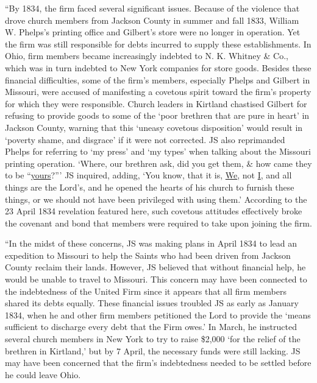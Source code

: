 			``By 1834, the firm faced several significant issues. Because of the violence that drove church members from Jackson County in summer and fall 1833, William W. Phelps's printing office and Gilbert's store were no longer in operation. Yet the firm was still responsible for debts incurred to supply these establishments. In Ohio, firm members became increasingly indebted to N. K. Whitney \& Co., which was in turn indebted to New York companies for store goods. Besides these financial difficulties, some of the firm's members, especially Phelps and Gilbert in Missouri, were accused of manifesting a covetous spirit toward the firm's property for which they were responsible. Church leaders in Kirtland chastised Gilbert for refusing to provide goods to some of the `poor brethren that are pure in heart' in Jackson County, warning that this `uneasy covetous disposition' would result in `poverty shame, and disgrace' if it were not corrected. JS also reprimanded Phelps for referring to `my press' and `my types' when talking about the Missouri printing operation. `Where, our brethren ask, did you get them, \& how came they to be ``\uline{yours}?''' JS inquired, adding, `You know, that it is, \uline{We}, not \uline{I}, and all things are the Lord's, and he opened the hearts of his church to furnish these things, or we should not have been privileged with using them.' According to the 23 April 1834 revelation featured here, such covetous attitudes effectively broke the covenant and bond that members were required to take upon joining the firm.
			
			``In the midst of these concerns, JS was making plans in April 1834 to lead an expedition to Missouri to help the Saints who had been driven from Jackson County reclaim their lands. However, JS believed that without financial help, he would be unable to travel to Missouri. This concern may have been connected to the indebtedness of the United Firm since it appears that all firm members shared its debts equally. These financial issues troubled JS as early as January 1834, when he and other firm members petitioned the Lord to provide the `means sufficient to discharge every debt that the Firm owes.' In March, he instructed several church members in New York to try to raise \$2,000 `for the relief of the brethren in Kirtland,' but by 7 April, the necessary funds were still lacking. JS may have been concerned that the firm's indebtedness needed to be settled before he could leave Ohio.
			
